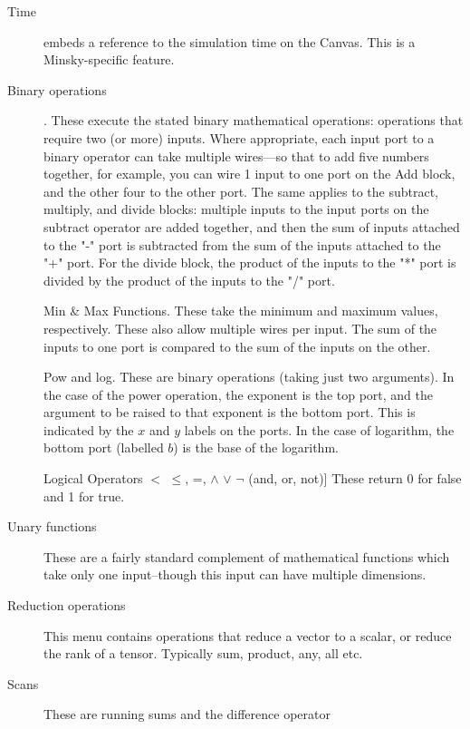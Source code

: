 \begin{description}
\item[Time]  embeds a reference to the simulation time on the Canvas. This is a Minsky-specific feature.

\item[Binary operations] . These execute the stated binary mathematical operations: operations that require two (or more) inputs. Where appropriate, each input port to a binary operator can take multiple wires---so that to add five numbers together, for example, you can wire 1 input to one port on the Add block, and the other four to the other port. The same applies to the subtract, multiply, and divide blocks: multiple inputs to the input ports on the subtract operator are added together, and then the sum of inputs attached to the "-" port is subtracted from the sum of the inputs attached to the "+" port. For the divide block, the product of the inputs to the "*" port is divided by the product of the inputs to the "/" port.



Min \& Max Functions. These take the minimum and maximum values, respectively. These also allow multiple wires per input. The sum of the inputs to one port is compared to the sum of the inputs on the other.

Pow and log. These are binary operations (taking just two arguments). In the case of the power operation, the exponent is the top port, and the argument to be raised to that exponent is the bottom port. This is indicated by the $x$ and $y$ labels on the ports. In the case of logarithm, the bottom port (labelled $b$) is the base of the logarithm.

Logical Operators $<$ $\le$, =, $\wedge$ $\vee$ $\neg$ (and, or, not)] These return 0 for false and 1 for true.

\item[Unary functions] These are a fairly standard complement of mathematical functions which take only one input--though this input can have multiple dimensions.

\item[Reduction operations] This menu contains operations that reduce a vector to a scalar, or reduce the rank of a tensor. Typically sum, product, any, all etc.

\item[Scans] These are running sums and the difference operator


\end{description}
